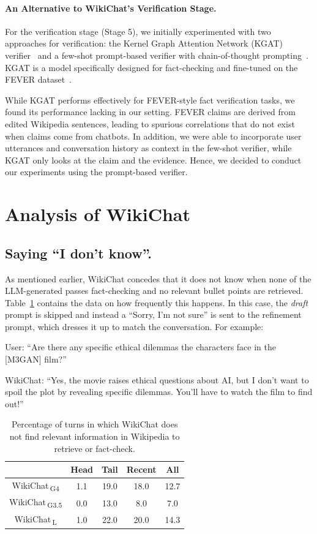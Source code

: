 \documentclass[11pt]{article}
\newcommand{\system}[0]{WikiChat\xspace}
\newcommand{\systemgt}[0]{WikiChat$\,$\textsubscript{G3.5}\xspace}
\newcommand{\systemgf}[0]{WikiChat$\,$\textsubscript{G4}\xspace}
\newcommand{\systeml}[0]{WikiChat$\,$\textsubscript{L}\xspace}
\begin{document}
\paragraph{An Alternative to \system's Verification Stage.}

For the verification stage (Stage 5), we initially experimented with two approaches for verification: the Kernel Graph Attention Network (KGAT) verifier~\cite{liu-etal-2020-fine} and a few-shot prompt-based verifier with chain-of-thought prompting~\cite{chain-of-thought}. KGAT is a model specifically designed for fact-checking and fine-tuned on the FEVER dataset~\cite{thorne-etal-2018-fever}.

While KGAT performs effectively for FEVER-style fact verification tasks, we found its performance lacking in our setting. FEVER claims are derived from edited Wikipedia sentences, leading to spurious correlations that do not exist when claims come from chatbots. In addition, we were able to incorporate user utterances and conversation history as context in the few-shot verifier, while KGAT only looks at the claim and the evidence. Hence, we decided to conduct our experiments using the prompt-based verifier.

\section{Analysis of \system}
\subsection{Saying ``I don't know''.} 
As mentioned earlier, \system concedes that it does not know when none of the LLM-generated passes fact-checking and no relevant bullet points are retrieved. Table~\ref{table:idk} contains the data on how frequently this happens. In this case, the \emph{draft} prompt is skipped and instead a ``Sorry, I'm not sure'' is sent to the refinement prompt, which dresses it up to match the conversation. For example:

User: ``Are there any specific ethical dilemmas the characters face in the [M3GAN] film?''

\system: ``Yes, the movie raises ethical questions about AI, but I don't want to spoil the plot by revealing specific dilemmas. You'll have to watch the film to find out!''

\begin{table}[ht]
\centering
\begin{tabular}{c c c c c}
 \hline
          & Head & Tail & Recent & All \\
 \hline
\systemgf & 1.1 & 19.0 & 18.0 & 12.7 \\
\systemgt & 0.0 & 13.0 & 8.0 & 7.0 \\
\systeml  & 1.0 & 22.0 & 20.0 & 14.3 \\
 \hline
\end{tabular}
\caption{Percentage of turns in which \system does not find relevant information in Wikipedia to retrieve or fact-check.}
\label{table:idk}
\end{table}
\end{document}
